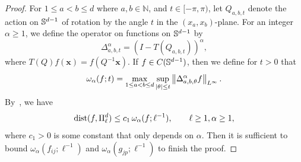 \begin{proof}
For $1 \leq a < b \leq d$ where $a,b\in\mathbb{N}$, and $t \in [-\pi,\pi)$, let $Q_{a,b,t}$ denote the action on ${\mathbb{S}}^{d-1}$ of rotation by the angle $t$ in the $(x_a, x_b)$-plane. For an integer $\alpha \geq 1$, we define the operator on functions on ${\mathbb{S}}^{d-1}$ by
\begin{equation*}
    \Delta_{a,b,t}^\alpha = (I - T(Q_{a,b,t}))^\alpha,
\end{equation*}
where $T(Q) f(\mathbf{x}) = f(Q^{-1} \mathbf{x})$. If $f \in C({\mathbb{S}}^{d-1})$, then we define for $t > 0$ that
\begin{equation*}
    \omega_\alpha(f;t) = \max_{1 \leq a < b \leq d} \sup_{\left|\theta\right| \leq t} \left\lVert\Delta^\alpha_{a,b,\theta} f\right\rVert_{L^\infty}.
\end{equation*}
By~\citep[Thm. 4.4.2]{dai}, we have
\begin{equation*}
    \text{dist}(f,\Pi^d_{\ell}) \leq c_1\, \omega_\alpha(f;\ell^{-1}), \qquad \ell \geq 1, \alpha \geq 1,
\end{equation*}
where $c_1 > 0$ is some constant that only depends on $\alpha$. Then it is sufficient to bound $\omega_\alpha(f_{ij};\ell^{-1})$ and $\omega_\alpha(g_{jp};\ell^{-1})$ to finish the proof.



\end{proof}
